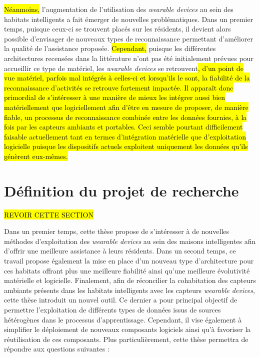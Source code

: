 {{\hl{Néanmoins, }l'augmentation de l'utilisation des \textit{wearable devices} au sein des habitats intelligents a fait émerger de nouvelles problématiques. Dans un premier temps, puisque ceux-ci se trouvent placés sur les résidents, il devient alors possible d'envisager de nouveaux types de reconnaissance permettant d'améliorer la qualité de l'assistance proposée. \hl{Cependant, }puisque les différentes architectures recensées dans la littérature n'ont pas été initialement prévues pour accueillir ce type de matériel, les \textit{wearable devices} se retrouvent\hl{, d'un point de vue matériel, parfois mal intégrés à celles-ci et lorsqu'ils le sont, la fiabilité de la reconnaissance d'activités se retrouve fortement impactée. Il apparaît donc primordial de s'intéresser à une manière de mieux les intégrer aussi bien matériellement que logiciellement afin d'être en mesure de proposer, de manière fiable, un processus de reconnaissance combinée entre les données fournies, à la fois par les capteurs ambiants et portables. Ceci semble pourtant difficilement faisable actuellement tant en termes d'intégration matérielle que d'exploitation logicielle puisque les dispositifs actuels exploitent uniquement les données qu'ils génèrent eux-mêmes.}


\section{Définition du projet de recherche}
\label{sec:def_proj}

\hl{REVOIR CETTE SECTION}

Dans un premier temps, cette thèse propose de s'intéresser à de nouvelles méthodes d'exploitation des \textit{wearable devices} au sein des maisons intelligentes afin d'offrir une meilleure assistance à leurs résidents. Dans un second temps, ce travail propose également la mise en place d'un nouveau type d'architecture pour ces habitats offrant plus une meilleure fiabilité ainsi qu'une meilleure évolutivité matérielle et logicielle. Finalement, afin de réconcilier la cohabitation des capteurs ambiants présents dans les habitats intelligents avec les capteurs \textit{wearable devices}, cette thèse introduit un nouvel outil. Ce dernier a pour principal objectif de permettre l'exploitation de différents types de données issus de sources hétérogènes dans le processus d'apprentissage. Cependant, il vise également à simplifier le déploiement de nouveaux composants logiciels ainsi qu'à favoriser la réutilisation de ces composants. Plus particulièrement, cette thèse permettra de répondre aux questions suivantes :

}}
